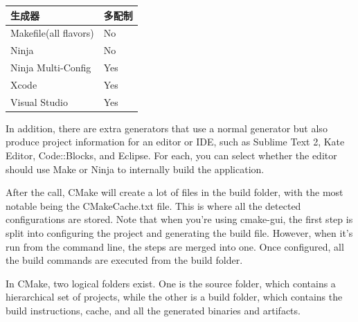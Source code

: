 \begin{table}[H]
	\centering
	\begin{tabular}{|l|l|}
		\hline
		\textbf{生成器}                                                                                                                  &  \textbf{多配制}                                                            \\ \hline
		Makefile(all flavors)                                                                                                                                  &                                                                           No       \\  \hline
		Ninja              &                                                                                  No\\  \hline
		Ninja Multi-Config  &  Yes                                                                                \\ \hline
    Xcode              &                                                                                  Yes\\  \hline
    Visual Studio              &                                                                                  Yes\\  \hline
	\end{tabular}
\end{table}

In addition, there are extra generators that use a normal generator but also produce project information for an editor or IDE, such as Sublime Text 2, Kate Editor, Code::Blocks, and Eclipse. For each, you can select whether the editor should use Make or Ninja to internally build the application.

After the call, CMake will create a lot of files in the build folder, with the most notable being the CMakeCache.txt file. This is where all the detected configurations are stored. Note that when you're using cmake-gui, the first step is split into configuring the project and generating the build file. However, when it's run from the command line, the steps are merged into one. Once configured, all the build commands are executed from the build folder.


In CMake, two logical folders exist. One is the source folder, which contains a hierarchical set of projects, while the other is a build folder, which contains the build instructions, cache, and all the generated binaries and artifacts.

